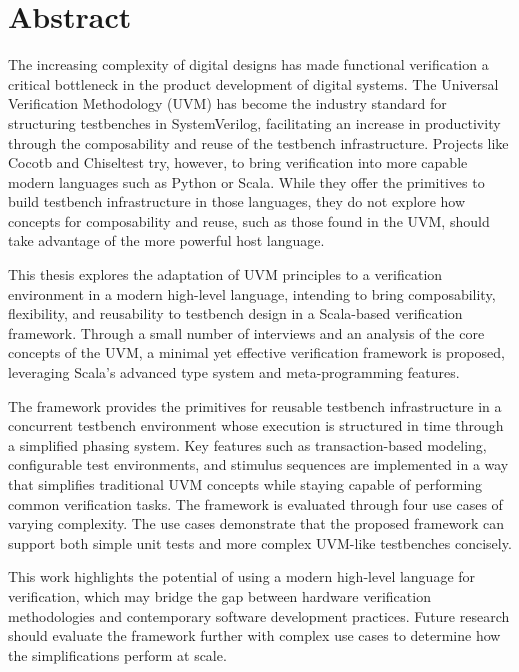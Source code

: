 \section*{Abstract}

The increasing complexity of digital designs has made functional verification a critical bottleneck in the product development of digital systems.
The Universal Verification Methodology (UVM) has become the industry standard for structuring testbenches in SystemVerilog, facilitating an increase in productivity through the composability and reuse of the testbench infrastructure. Projects like Cocotb and Chiseltest try, however, to bring verification into more capable modern languages such as Python or Scala. While they offer the primitives to build testbench infrastructure in those languages, they do not explore how concepts for composability and reuse, such as those found in the UVM, should take advantage of the more powerful host language.

This thesis explores the adaptation of UVM principles to a verification environment in a modern high-level language, intending to bring composability, flexibility, and reusability to testbench design in a Scala-based verification framework. Through a small number of interviews and an analysis of the core concepts of the UVM, a minimal yet effective verification framework is proposed, leveraging Scala’s advanced type system and meta-programming features.

The framework provides the primitives for reusable testbench infrastructure in a concurrent testbench environment whose execution is structured in time through a simplified phasing system. Key features such as transaction-based modeling, configurable test environments, and stimulus sequences are implemented in a way that simplifies traditional UVM concepts while staying capable of performing common verification tasks. The framework is evaluated through four use cases of varying complexity. The use cases demonstrate that the proposed framework can support both simple unit tests and more complex UVM-like testbenches concisely.

This work highlights the potential of using a modern high-level language for verification, which may bridge the gap between hardware verification methodologies and contemporary software development practices. Future research should evaluate the framework further with complex use cases to determine how the simplifications perform at scale.





